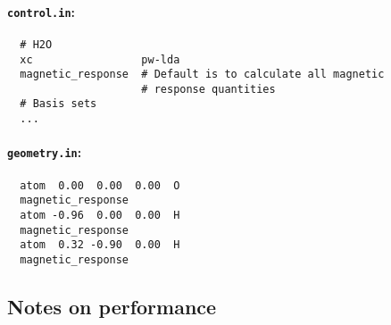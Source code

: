 \paragraph{\texttt{control.in}:}
\begin{verbatim}
  # H2O
  xc                 pw-lda
  magnetic_response  # Default is to calculate all magnetic
                     # response quantities
  # Basis sets
  ...
\end{verbatim}
\paragraph{\texttt{geometry.in}:}
\begin{verbatim}
  atom  0.00  0.00  0.00  O
  magnetic_response
  atom -0.96  0.00  0.00  H
  magnetic_response
  atom  0.32 -0.90  0.00  H
  magnetic_response
\end{verbatim}

\subsection*{Notes on performance}

